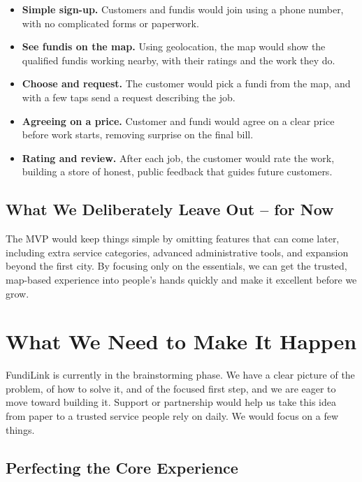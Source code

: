 \documentclass[11pt,a4paper]{article}
\begin{document}
\begin{itemize}[leftmargin=1.5em, label={--}]
    \item \textbf{Simple sign-up.} Customers and fundis would join using a phone number, with
          no complicated forms or paperwork.
    \item \textbf{See fundis on the map.} Using geolocation, the map would show the qualified
          fundis working nearby, with their ratings and the work they do.
    \item \textbf{Choose and request.} The customer would pick a fundi from the map, and with
          a few taps send a request describing the job.
    \item \textbf{Agreeing on a price.} Customer and fundi would agree on a clear price before
          work starts, removing surprise on the final bill.
    \item \textbf{Rating and review.} After each job, the customer would rate the work,
          building a store of honest, public feedback that guides future customers.
\end{itemize}

\subsection{What We Deliberately Leave Out -- for Now}

The MVP would keep things simple by omitting features that can come later, including extra
service categories, advanced administrative tools, and expansion beyond the first city. By
focusing only on the essentials, we can get the trusted, map-based experience into people's
hands quickly and make it excellent before we grow.

\section{What We Need to Make It Happen}

FundiLink is currently in the brainstorming phase. We have a clear picture of the problem, of
how to solve it, and of the focused first step, and we are eager to move toward building it.
Support or partnership would help us take this idea from paper to a trusted service people
rely on daily. We would focus on a few things.

\subsection{Perfecting the Core Experience}
\end{document}
